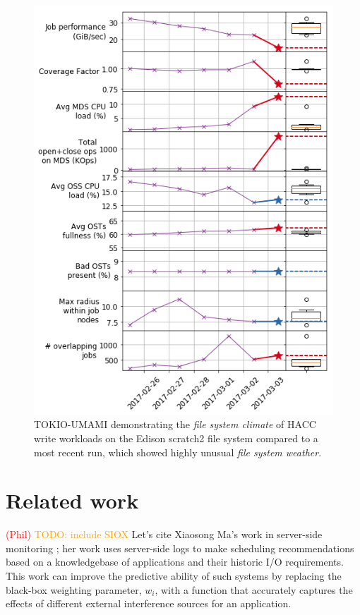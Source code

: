 \documentclass[conference,10pt,compsocconf]{IEEEtran}
\newcommand{\assign}[1]{\textcolor{red}{(#1)}}
\newcommand{\todo}[1]{\textcolor{Orange}{TODO: #1}}
\begin{document}
\begin{figure}[t]
	\centering
	\includegraphics[width=1.0\columnwidth]{figs/edison-haccio-write-dashboard.png}
	\caption{TOKIO-UMAMI demonstrating the \emph{file system climate} of HACC write workloads
	on the Edison scratch2 file system compared to a most recent run, which showed
    highly unusual \emph{file system weather}.}
	\label{fig:edison-haccio-write-umami}
\end{figure}

\section{Related work} \label{sec:related}

\assign{Phil} \todo{include SIOX} Let's cite Xiaosong Ma's work in server-side
monitoring \cite{Liu2016}; her work uses server-side logs to make scheduling
recommendations based on a knowledgebase of applications and their historic
I/O requirements.  This work can improve the predictive ability of such systems
by replacing the black-box weighting parameter, $w_{i}$, with a function that
accurately captures the effects of different external interference sources for
an application.
\end{document}
